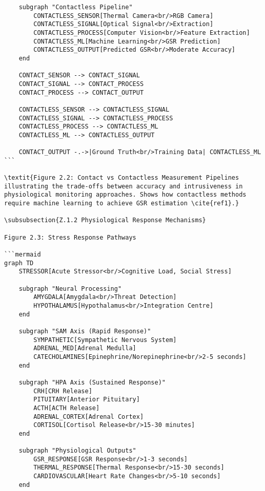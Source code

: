 \begin{verbatim}
    subgraph "Contactless Pipeline"
        CONTACTLESS_SENSOR[Thermal Camera<br/>RGB Camera]
        CONTACTLESS_SIGNAL[Optical Signal<br/>Extraction]
        CONTACTLESS_PROCESS[Computer Vision<br/>Feature Extraction]
        CONTACTLESS_ML[Machine Learning<br/>GSR Prediction]
        CONTACTLESS_OUTPUT[Predicted GSR<br/>Moderate Accuracy]
    end

    CONTACT_SENSOR --> CONTACT_SIGNAL
    CONTACT_SIGNAL --> CONTACT_PROCESS
    CONTACT_PROCESS --> CONTACT_OUTPUT

    CONTACTLESS_SENSOR --> CONTACTLESS_SIGNAL
    CONTACTLESS_SIGNAL --> CONTACTLESS_PROCESS
    CONTACTLESS_PROCESS --> CONTACTLESS_ML
    CONTACTLESS_ML --> CONTACTLESS_OUTPUT

    CONTACT_OUTPUT -.->|Ground Truth<br/>Training Data| CONTACTLESS_ML
```

\textit{Figure 2.2: Contact vs Contactless Measurement Pipelines illustrating the trade-offs between accuracy and intrusiveness in physiological monitoring approaches. Shows how contactless methods require machine learning to achieve GSR estimation \cite{ref1}.}

\subsubsection{Z.1.2 Physiological Response Mechanisms}

Figure 2.3: Stress Response Pathways

```mermaid
graph TD
    STRESSOR[Acute Stressor<br/>Cognitive Load, Social Stress]

    subgraph "Neural Processing"
        AMYGDALA[Amygdala<br/>Threat Detection]
        HYPOTHALAMUS[Hypothalamus<br/>Integration Centre]
    end

    subgraph "SAM Axis (Rapid Response)"
        SYMPATHETIC[Sympathetic Nervous System]
        ADRENAL_MED[Adrenal Medulla]
        CATECHOLAMINES[Epinephrine/Norepinephrine<br/>2-5 seconds]
    end

    subgraph "HPA Axis (Sustained Response)"
        CRH[CRH Release]
        PITUITARY[Anterior Pituitary]
        ACTH[ACTH Release]
        ADRENAL_CORTEX[Adrenal Cortex]
        CORTISOL[Cortisol Release<br/>15-30 minutes]
    end

    subgraph "Physiological Outputs"
        GSR_RESPONSE[GSR Response<br/>1-3 seconds]
        THERMAL_RESPONSE[Thermal Response<br/>15-30 seconds]
        CARDIOVASCULAR[Heart Rate Changes<br/>5-10 seconds]
    end


\end{verbatim}
